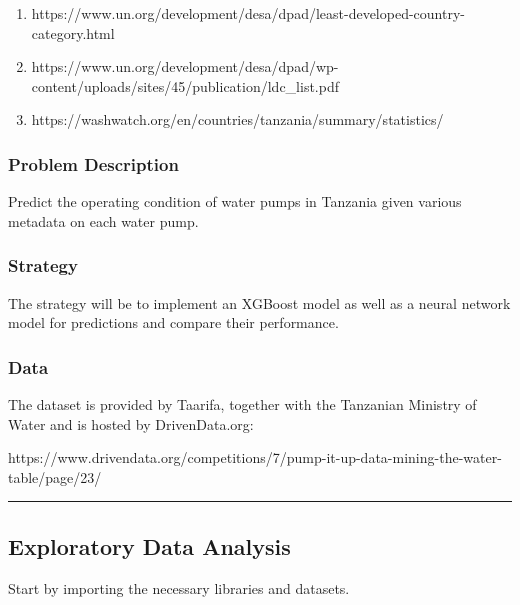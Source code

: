 \documentclass[11pt]{article}
\providecommand{\tightlist}{%
      \setlength{\itemsep}{0pt}\setlength{\parskip}{0pt}}
\begin{document}
\begin{enumerate}
\def\labelenumi{\arabic{enumi}.}
\tightlist
\item
  https://www.un.org/development/desa/dpad/least-developed-country-category.html
\item
  https://www.un.org/development/desa/dpad/wp-content/uploads/sites/45/publication/ldc\_list.pdf
\item
  https://washwatch.org/en/countries/tanzania/summary/statistics/
\end{enumerate}

    \subsubsection{Problem Description}\label{problem-description}

    Predict the operating condition of water pumps in Tanzania given various
metadata on each water pump.

    \subsubsection{Strategy}\label{strategy}

    The strategy will be to implement an XGBoost model as well as a neural
network model for predictions and compare their performance.

    \subsubsection{Data}\label{data}

    The dataset is provided by Taarifa, together with the Tanzanian Ministry
of Water and is hosted by DrivenData.org:

https://www.drivendata.org/competitions/7/pump-it-up-data-mining-the-water-table/page/23/

    \begin{center}\rule{0.5\linewidth}{\linethickness}\end{center}

    \subsection{Exploratory Data Analysis}\label{exploratory-data-analysis}

    Start by importing the necessary libraries and datasets.
\end{document}
